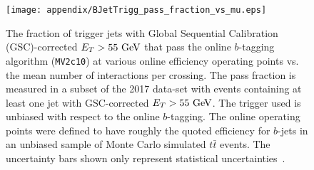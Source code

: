 \begin{figure}[htbp]
 \centering
 \texttt{[image: appendix/BJetTrigg\_pass\_fraction\_vs\_mu.eps]}
 \caption[The fraction of trigger jets with Global-Sequential-Calibration-corrected $E_T > 55~\GeV$ that pass the online $b$-tagging algorithm (\texttt{MV2c10}) at various online efficiency operating points vs. the mean number of interactions per crossing.]{%
  The fraction of trigger jets with Global Sequential Calibration (GSC)-corrected $E_T > 55~\GeV$ that pass the online $b$-tagging algorithm (\texttt{MV2c10}) at various online efficiency operating points vs. the mean number of interactions per crossing.
  The pass fraction is measured in a subset of the 2017 data-set with events containing at least one jet with GSC-corrected $E_T > 55~\GeV$.
  The trigger used is unbiased with respect to the online $b$-tagging.
  The online operating points were defined to have roughly the quoted efficiency for $b$-jets in an unbiased sample of Monte Carlo simulated $t\bar{t}$ events.
  The uncertainty bars shown only represent statistical uncertainties~\cite{Feickert:2294576}.}
 \label{fig:BJetTrigg_pass_fraction_vs_mu}
\end{figure}
